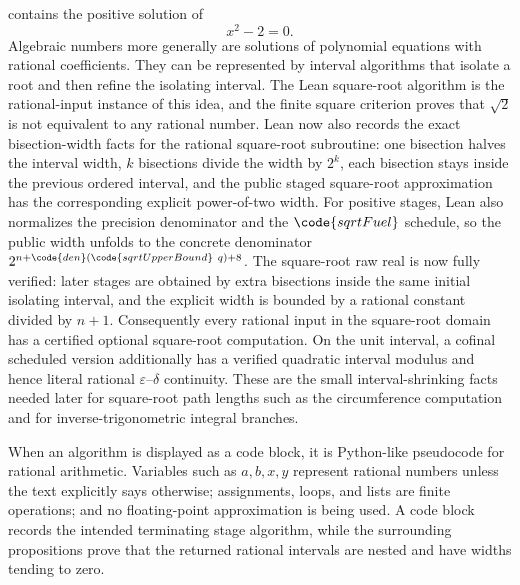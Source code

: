 \begin{remark}
contains the positive solution of
\[
  x^2-2=0.
\]
Algebraic numbers more generally are solutions of polynomial equations with
rational coefficients.  They can be represented by interval algorithms that
isolate a root and then refine the isolating interval.  The Lean square-root
algorithm is the rational-input instance of this idea, and the finite square
criterion proves that \(\sqrt2\) is not equivalent to any rational number.
Lean now also records the exact bisection-width facts for the rational
square-root subroutine: one bisection halves the interval width, \(k\)
bisections divide the width by \(2^k\), each bisection stays inside the
previous ordered interval, and the public staged square-root approximation has
the corresponding explicit power-of-two width.  For positive stages, Lean also
normalizes the precision denominator and the \(\code{sqrtFuel}\) schedule, so
the public width unfolds to the concrete denominator
\(2^{n+\code{den}(\code{sqrtUpperBound}\ q)+8}\).  The square-root raw real is
now fully verified: later stages are obtained by extra bisections inside the
same initial isolating interval, and the explicit width is bounded by a
rational constant divided by \(n+1\).  Consequently every rational input in
the square-root domain has a certified optional square-root computation.
On the unit interval, a cofinal scheduled version additionally has a verified
quadratic interval modulus and hence literal rational
\(\varepsilon\)--\(\delta\) continuity.  These are the small interval-shrinking
facts needed later for square-root path lengths such as the circumference
computation and for inverse-trigonometric integral branches.
\end{remark}

\begin{remark}\label{rem:pseudocode-convention}
When an algorithm is displayed as a code block, it is Python-like pseudocode
for rational arithmetic.  Variables such as \(a,b,x,y\) represent rational
numbers unless the text explicitly says otherwise; assignments, loops, and
lists are finite operations; and no floating-point approximation is being
used.  A code block records the intended terminating stage algorithm, while
the surrounding propositions prove that the returned rational intervals are
nested and have widths tending to zero.
\end{remark}

